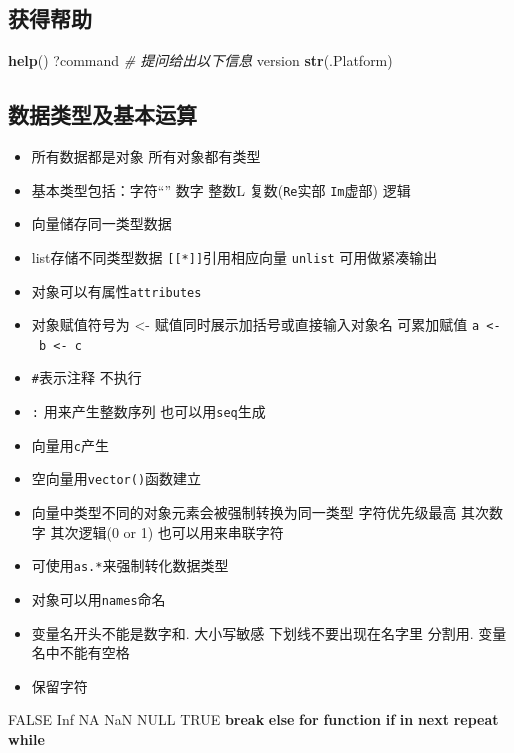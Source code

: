 \documentclass[]{book}
\newenvironment{Shaded}{\begin{snugshade}}{\end{snugshade}}
\newcommand{\CommentTok}[1]{\textcolor[rgb]{0.56,0.35,0.01}{\textit{#1}}}
\newcommand{\ControlFlowTok}[1]{\textcolor[rgb]{0.13,0.29,0.53}{\textbf{#1}}}
\newcommand{\KeywordTok}[1]{\textcolor[rgb]{0.13,0.29,0.53}{\textbf{#1}}}
\newcommand{\NormalTok}[1]{#1}
\newcommand{\OtherTok}[1]{\textcolor[rgb]{0.56,0.35,0.01}{#1}}
\providecommand{\tightlist}{%
  \setlength{\itemsep}{0pt}\setlength{\parskip}{0pt}}
\begin{document}
\subsection{获得帮助}

\begin{Shaded}
\begin{Highlighting}[]
\KeywordTok{help}\NormalTok{()}
\NormalTok{?command}
\CommentTok{# 提问给出以下信息}
\NormalTok{version}
\KeywordTok{str}\NormalTok{(.Platform)}
\end{Highlighting}
\end{Shaded}

\subsection{数据类型及基本运算}

\begin{itemize}
\tightlist
\item
  所有数据都是对象 所有对象都有类型
\item
  基本类型包括：字符``'' 数字 整数L 复数(\texttt{Re}实部 \texttt{Im}虚部) 逻辑
\item
  向量储存同一类型数据
\item
  list存储不同类型数据 \texttt{{[}{[}*{]}{]}}引用相应向量 \texttt{unlist} 可用做紧凑输出
\item
  对象可以有属性\texttt{attributes}
\item
  对象赋值符号为 \textless{}- 赋值同时展示加括号或直接输入对象名 可累加赋值 \texttt{a\ \textless{}-\ b\ \textless{}-\ c}
\item
  \texttt{\#}表示注释 不执行
\item
  \texttt{:} 用来产生整数序列 也可以用\texttt{seq}生成
\item
  向量用\texttt{c}产生
\item
  空向量用\texttt{vector()}函数建立
\item
  向量中类型不同的对象元素会被强制转换为同一类型 字符优先级最高 其次数字 其次逻辑(0 or 1) 也可以用来串联字符
\item
  可使用\texttt{as.*}来强制转化数据类型
\item
  对象可以用\texttt{names}命名
\item
  变量名开头不能是数字和. 大小写敏感 下划线不要出现在名字里 分割用. 变量名中不能有空格
\item
  保留字符
\end{itemize}

\begin{Shaded}
\begin{Highlighting}[]
\OtherTok{FALSE} \OtherTok{Inf} \OtherTok{NA} \OtherTok{NaN} \OtherTok{NULL} \OtherTok{TRUE} \ControlFlowTok{break} \ControlFlowTok{else} \ControlFlowTok{for} \ControlFlowTok{function} \ControlFlowTok{if} \ControlFlowTok{in} \ControlFlowTok{next} \ControlFlowTok{repeat} \ControlFlowTok{while}
\end{Highlighting}
\end{Shaded}
\end{document}

